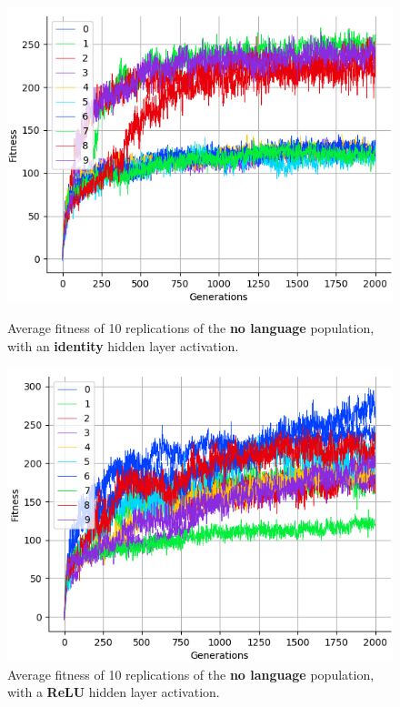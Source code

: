 \documentclass[12pt,a4paper]{report}
\begin{document}
\begin{figure}[t]
   \centering
   \begin{minipage}{0.49\textwidth}
          \centering
          \captionsetup{width=.9\linewidth}
          \includegraphics[width=1.\linewidth]{results/ten-none-identity.png}
          \caption{Average fitness of 10 replications of the {\bf no language} population, with an {\bf identity} hidden layer activation.}
          \label{fig:ten-none-identity}
   \end{minipage}
   \begin{minipage}{0.49\textwidth}
          \centering
          \captionsetup{width=.9\linewidth}
          \includegraphics[width=1.\linewidth]{results/ten-none-relu.png}
          \caption{Average fitness of 10 replications of the {\bf no language} population, with a {\bf ReLU} hidden layer activation.}
          \label{fig:ten-none-relu}
   \end{minipage}
\end{figure}
\end{document}
